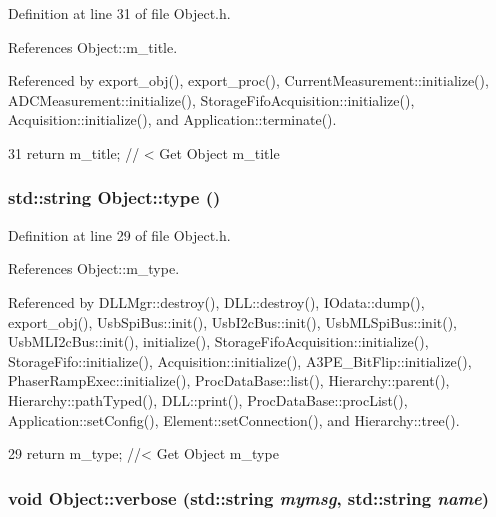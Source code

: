 Definition at line 31 of file Object.h.

References Object::m\_\-title.

Referenced by export\_\-obj(), export\_\-proc(), CurrentMeasurement::initialize(), ADCMeasurement::initialize(), StorageFifoAcquisition::initialize(), Acquisition::initialize(), and Application::terminate().


\begin{DoxyCode}
31 { return m_title;      } // < Get Object m_title
\end{DoxyCode}
\hypertarget{classObject_a84f99f70f144a83e1582d1d0f84e4e62}{
\subsubsection[{type}]{\setlength{\rightskip}{0pt plus 5cm}std::string Object::type ()}}
\label{classObject_a84f99f70f144a83e1582d1d0f84e4e62}


Definition at line 29 of file Object.h.

References Object::m\_\-type.

Referenced by DLLMgr::destroy(), DLL::destroy(), IOdata::dump(), export\_\-obj(), UsbSpiBus::init(), UsbI2cBus::init(), UsbMLSpiBus::init(), UsbMLI2cBus::init(), initialize(), StorageFifoAcquisition::initialize(), StorageFifo::initialize(), Acquisition::initialize(), A3PE\_\-BitFlip::initialize(), PhaserRampExec::initialize(), ProcDataBase::list(), Hierarchy::parent(), Hierarchy::pathTyped(), DLL::print(), ProcDataBase::procList(), Application::setConfig(), Element::setConnection(), and Hierarchy::tree().


\begin{DoxyCode}
29 { return m_type;       } //< Get Object m_type
\end{DoxyCode}
\hypertarget{classObject_a2d4120195317e2a3c6532e8bb9f3da68}{
\subsubsection[{verbose}]{\setlength{\rightskip}{0pt plus 5cm}void Object::verbose (std::string {\em mymsg}, \/  std::string {\em name})}}
\label{classObject_a2d4120195317e2a3c6532e8bb9f3da68}



